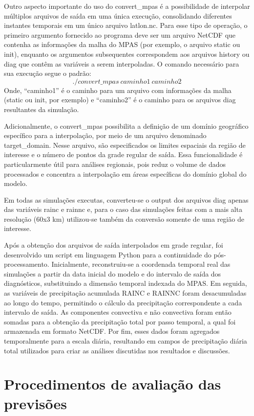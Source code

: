 \documentclass[12pt,a4paper,oneside]{book}
\begin{document}
Outro aspecto importante do uso do convert\_mpas é a possibilidade de interpolar múltiplos arquivos de saída em uma única execução, consolidando diferentes instantes temporais em um único arquivo latlon.nc. Para esse tipo de operação, o primeiro argumento fornecido ao programa deve ser um arquivo NetCDF que contenha as informações da malha do MPAS (por exemplo, o arquivo static ou init), enquanto os argumentos subsequentes correspondem aos arquivos history ou diag que contêm as variáveis a serem interpoladas. O comando necessário para sua execução segue o padrão:
\[
./convert\_mpas\ caminho1\ caminho2
\]
Onde, ``caminho1'' é o caminho para um arquivo com informações da malha (static ou init, por exemplo) e ``caminho2'' é o caminho para os arquivos diag resultantes da simulação.

Adicionalmente, o convert\_mpas possibilita a definição de um domínio geográfico específico para a interpolação, por meio de um arquivo denominado target\_domain. Nesse arquivo, são especificados os limites espaciais da região de interesse e o número de pontos da grade regular de saída. Essa funcionalidade é particularmente útil para análises regionais, pois reduz o volume de dados processados e concentra a interpolação em áreas específicas do domínio global do modelo.

Em todas as simulações executas, converteu-se o output dos arquivos diag apenas das variáveis rainc e rainnc e, para o caso das simulações feitas com a mais alta resolução (60x3 km) utilizou-se também da conversão somente de uma região de interesse.

Após a obtenção dos arquivos de saída interpolados em grade regular, foi desenvolvido um script em linguagem Python para a continuidade do pós-processamento. Inicialmente, reconstruiu-se a coordenada temporal real das simulações a partir da data inicial do modelo e do intervalo de saída dos diagnósticos, substituindo a dimensão temporal indexada do MPAS. Em seguida, as variáveis de precipitação acumulada RAINC e RAINNC foram desacumuladas ao longo do tempo, permitindo o cálculo da precipitação correspondente a cada intervalo de saída. As componentes convectiva e não convectiva foram então somadas para a obtenção da precipitação total por passo temporal, a qual foi armazenada em formato NetCDF. Por fim, esses dados foram agregados temporalmente para a escala diária, resultando em campos de precipitação diária total utilizados para criar as análises discutidas nos resultados e discussões.

\section{Procedimentos de avaliação das previsões}
\label{sec:procedimentos-avaliacao}
\end{document}
